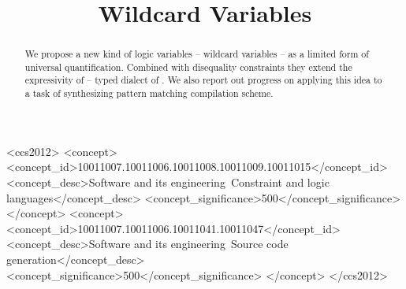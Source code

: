 \documentclass
  [sigplan
  ,screen
  ,review
  ]{acmart}
\begin{document}
\title[xxx]{Wildcard Variables}





%

\begin{abstract}
We propose a new kind of logic variables -- wildcard variables -- as a limited form of universal quantification. Combined with disequality constraints they extend the expressivity of \OCanren{} -- typed dialect of \miniKanren{}. We also report out progress on applying this idea to a task of synthesizing pattern matching compilation scheme.
\end{abstract}


\begin{CCSXML}
<ccs2012>
<concept>
<concept_id>10011007.10011006.10011008.10011009.10011015</concept_id>
<concept_desc>Software and its engineering~Constraint and logic languages</concept_desc>
<concept_significance>500</concept_significance>
</concept>
<concept>
<concept_id>10011007.10011006.10011041.10011047</concept_id>
<concept_desc>Software and its engineering~Source code generation</concept_desc>
<concept_significance>500</concept_significance>
</concept>
</ccs2012>
\end{CCSXML}

\end{document}
